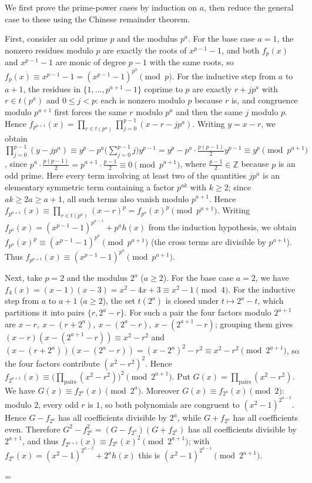 \documentclass[11pt]{article}
\makeatletter
\let\nt@closedisplay\]
\def\nt@guardedclose{\@ifnextchar\par{\nt@closeafterpar}{\@ifnextchar\end{\postdisplaypenalty\@M\nt@closedisplay}{\nt@closedisplay}}}
\def\nt@closeafterpar\par{\@ifnextchar\par{\nt@closeafterpar}{\@ifnextchar\end{\postdisplaypenalty\@M\nt@closedisplay\par}{\nt@closedisplay\par}}}
\renewenvironment{proof}[1][\proofname]{\par
  \pushQED{\qed}\normalfont\topsep\medskipamount\edef\nt@afterproof{\@endparpenalty=\the\@endparpenalty\relax}\@beginparpenalty\@M\@endparpenalty\@M\let\]\nt@guardedclose\trivlist\item[]\textit{#1\@addpunct{.}} \ignorespaces}{\ifvmode\addpenalty\@M\fi\popQED\nt@afterproof\endtrivlist\@endpefalse}
\theoremstyle{ntstyle}
\makeatother
\begin{document}
\begin{proof} We first prove the prime-power cases by
  induction on $a$, then reduce the general case to these using the Chinese remainder theorem.

  First, consider an odd prime $p$ and the modulus $p^a$. For the base case $a = 1$, the nonzero residues modulo
  $p$ are exactly the roots of $x^{p-1} - 1$, and both $f_p(x)$ and $x^{p-1} - 1$ are monic of degree $p-1$
  with the same roots, so $f_p(x) \equiv x^{p-1} - 1 = (x^{p-1}-1)^{p^{0}} \pmod{p}$. For the inductive step from
  $a$ to $a+1$, the
  residues in $\{1,\ldots,p^{a+1}-1\}$ coprime to $p$ are exactly $r+jp^a$ with $r\in t(p^a)$ and $0\le j<p$: each
  is nonzero modulo $p$ because $r$ is, and congruence modulo $p^{a+1}$ first forces the same $r$ modulo $p^a$ and
  then the same $j$ modulo $p$. Hence $f_{p^{a+1}}(x) = \prod_{r \in t(p^{a})} \prod_{j=0}^{p-1}(x - r - j p^{a})$.
  Writing
  $y = x - r$, we obtain $\prod_{j=0}^{p-1}(y - j p^{a}) \equiv y^{p} -
    p^{a}\big(\textstyle\sum_{j=0}^{p-1} j\big) y^{p-1} = y^{p} -
    p^{a}\cdot\tfrac{p(p-1)}{2}y^{p-1} \equiv y^{p} \pmod{p^{a+1}}$, since
  $p^{a}\cdot\tfrac{p(p-1)}{2} = p^{a+1}\cdot\tfrac{p-1}{2} \equiv 0 \pmod{p^{a+1}}$, where
  $\tfrac{p-1}{2} \in \mathbb{Z}$ because
  $p$ is an odd prime. Here every term involving at least two of the quantities $jp^a$ is
  an elementary symmetric term containing a factor $p^{ak}$ with
  $k\ge2$; since $ak\ge2a\ge a+1$, all such terms also vanish modulo
  $p^{a+1}$. Hence $f_{p^{a+1}}(x) \equiv \prod_{r\in t(p^a)}(x-r)^p=f_{p^a}(x)^p \pmod{p^{a+1}}$. Writing
  $f_{p^{a}}(x) = (x^{p-1}-1)^{p^{a-1}} + p^{a} h(x)$ from the
  induction hypothesis, we obtain $f_{p^{a}}(x)^{p} \equiv (x^{p-1}-1)^{p^{a}} \pmod{p^{a+1}}$ (the cross terms are
  divisible by $p^{a+1}$). Thus
  $f_{p^{a+1}}(x) \equiv (x^{p-1}-1)^{p^{a}} \pmod{p^{a+1}}$.

  Next, take $p=2$ and the modulus $2^a$ ($a \ge 2$). For the base case $a = 2$, we have
  $f_4(x) = (x-1)(x-3) = x^{2} - 4x + 3 \equiv x^{2} - 1 \pmod{4}$. For the inductive step from $a$ to $a+1$
  ($a \ge 2$),
  the set $t(2^{a})$ is closed under $t \mapsto 2^{a} - t$, which partitions it
  into pairs $\{r, 2^{a}-r\}$. For such a pair the four factors modulo
  $2^{a+1}$ are $x - r,\ x - (r + 2^{a}),\ x - (2^{a} - r),\ x - (2^{a+1} - r)$; grouping them gives
  $(x-r)(x-(2^{a+1}-r)) \equiv x^{2} - r^{2}$
  and $(x-(r+2^{a}))(x-(2^{a}-r)) = (x-2^{a})^{2} - r^{2} \equiv x^{2} - r^{2} \pmod{2^{a+1}}$, so the four factors
  contribute $(x^{2}-r^{2})^{2}$.
  Hence $f_{2^{a+1}}(x) \equiv \big(\prod_{\text{pairs}}(x^{2}-r^{2})\big)^{2} \pmod{2^{a+1}}$.
  Put $G(x)=\prod_{\text{pairs}}(x^{2}-r^{2})$. We have $G(x)\equiv f_{2^{a}}(x)\pmod{2^{a}}$. Moreover
  $G(x)\equiv f_{2^{a}}(x)\pmod{2}$: modulo $2$, every odd $r$ is $1$, so both polynomials are congruent to
  $(x^2-1)^{2^{a-2}}$. Hence $G-f_{2^a}$ has all coefficients divisible by $2^a$, while $G+f_{2^a}$ has all
  coefficients even. Therefore $G^2-f_{2^a}^2=(G-f_{2^a})(G+f_{2^a})$ has all coefficients divisible by $2^{a+1}$,
  and thus $f_{2^{a+1}}(x) \equiv f_{2^{a}}(x)^{2} \pmod{2^{a+1}}$; with
  $f_{2^{a}}(x) = (x^{2}-1)^{2^{a-2}} + 2^{a} h(x)$ this is $(x^{2}-1)^{2^{a-1}} \pmod{2^{a+1}}$.


\end{proof}
\end{document}
